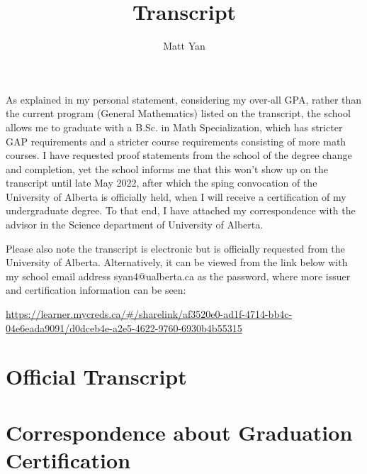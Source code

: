 \documentclass[11pt]{article}
\title{Transcript}
\author{Matt Yan}
\begin{document}
    \maketitle

    As explained in my personal statement, considering my over-all GPA,
    rather than the current program (General Mathematics) listed on the transcript,
    the school allows me to graduate with a B.Sc. in Math Specialization,
    which has stricter GAP requirements and a stricter course requirements consisting of more math courses.
    I have requested proof statements from the school of the degree change and completion,
    yet the school informs me that this won't show up on the transcript until late May 2022, after which
    the sping convocation of the University of Alberta is officially held,
    when I will receive a certification of my undergraduate degree.
    To that end, I have attached my correspondence with the advisor in the Science department of University of Alberta.

    Please also note the transcript is electronic but is officially requested from the University of Alberta.
    Alternatively, it can be viewed from the link below with my school email address syan4@ualberta.ca as the password,
    where more issuer and certification information can be seen:

    \href{https://learner.mycreds.ca/#/sharelink/af3520e0-ad1f-4714-bb4c-04e6eada9091/d0dceb4e-a2e5-4622-9760-6930b4b55315}{
        \tiny{https://learner.mycreds.ca/\#/sharelink/af3520e0-ad1f-4714-bb4c-04e6eada9091/d0dceb4e-a2e5-4622-9760-6930b4b55315}
    }

    \newpage
    \section*{Official Transcript}

    



    \section*{Correspondence about Graduation Certification}

    
\end{document}

